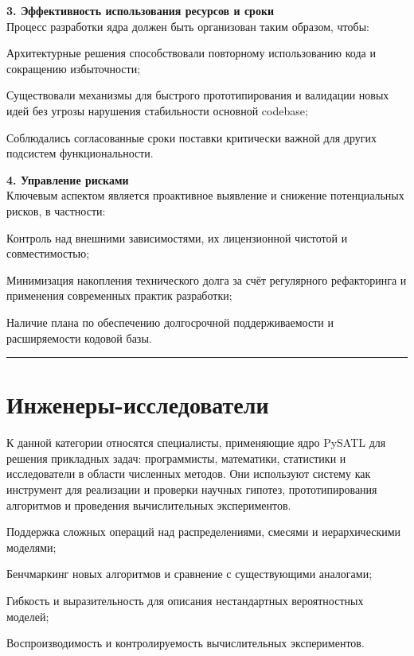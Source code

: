 \textbf{3. Эффективность использования ресурсов и сроки} \\
Процесс разработки ядра должен быть организован таким образом, чтобы:
\begin{itemizecmp}
    \item Архитектурные решения способствовали повторному использованию кода и сокращению избыточности;
    \item Существовали механизмы для быстрого прототипирования и валидации новых идей без угрозы нарушения стабильности основной codebase;
    \item Соблюдались согласованные сроки поставки критически важной для других подсистем функциональности.
\end{itemizecmp}

\textbf{4. Управление рисками} \\
Ключевым аспектом является проактивное выявление и снижение потенциальных рисков, в частности:
\begin{itemizecmp}
    \item Контроль над внешними зависимостями, их лицензионной чистотой и совместимостью;
    \item Минимизация накопления технического долга за счёт регулярного рефакторинга и применения современных практик разработки;
    \item Наличие плана по обеспечению долгосрочной поддерживаемости и расширяемости кодовой базы.
\end{itemizecmp}

\noindent\rule{\textwidth}{0.5pt}
\section{Инженеры-исследователи}

К данной категории относятся специалисты, применяющие ядро PySATL для решения прикладных задач: программисты, математики, статистики и исследователи в области численных методов. Они используют систему как инструмент для реализации и проверки научных гипотез, прототипирования алгоритмов и проведения вычислительных экспериментов.

\begin{itemizecmp}
    \item Поддержка сложных операций над распределениями, смесями и иерархическими моделями;
    \item Бенчмаркинг новых алгоритмов и сравнение с существующими аналогами;
    \item Гибкость и выразительность для описания нестандартных вероятностных моделей;
    \item Воспроизводимость и контролируемость вычислительных экспериментов.
\end{itemizecmp}


